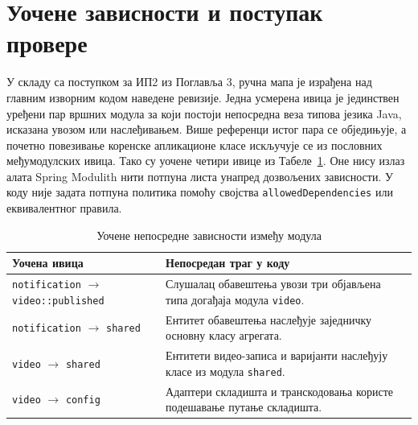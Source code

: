 \documentclass[12pt,oneside]{memoir}
\begin{document}

\section{Уочене зависности и поступак провере}

У складу са поступком за ИП2 из Поглавља 3, ручна мапа је израђена над главним
изворним кодом наведене ревизије. Једна усмерена ивица је јединствен уређени
пар вршних модула за који постоји непосредна веза типова језика {\lat Java},
исказана увозом или наслеђивањем. Више референци истог пара се обједињује, а
почетно повезивање коренске апликационе класе искључује се из пословних
међумодулских ивица. Тако су уочене четири ивице из
Табеле~\ref{tab:modularni-monolit-zavisnosti}. Оне нису излаз алата
{\lat Spring Modulith} нити потпуна листа унапред дозвољених зависности. У коду
није задата потпуна политика помоћу својства \texttt{allowedDependencies} или
еквивалентног правила.

\begin{table}[!ht]
	\centering
	\small
	\begin{tabular}{|>{\raggedright\arraybackslash}p{}|>{\raggedright\arraybackslash}p{}|}
		\hline
		\textbf{Уочена ивица} & \textbf{Непосредан траг у коду} \\
		\hline
		\texttt{notifi\allowbreak cation} $\rightarrow$ \texttt{video::published} & Слушалац обавештења увози три објављена типа догађаја модула \texttt{video}. \\
		\hline
		\texttt{notifi\allowbreak cation} $\rightarrow$ \texttt{shared} & Ентитет обавештења наслеђује заједничку основну класу агрегата. \\
		\hline
		\texttt{video} $\rightarrow$ \texttt{shared} & Ентитети видео-записа и варијанти наслеђују класе из модула \texttt{shared}. \\
		\hline
		\texttt{video} $\rightarrow$ \texttt{config} & Адаптери складишта и транскодовања користе подешавање путање складишта. \\
		\hline
	\end{tabular}
	\caption{Уочене непосредне зависности између модула}
	\label{tab:modularni-monolit-zavisnosti}
\end{table}

\end{document}
